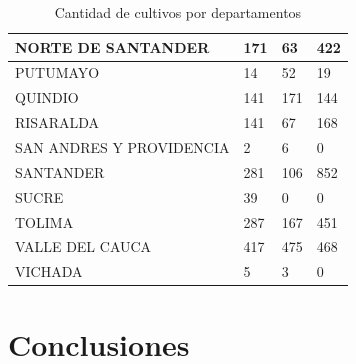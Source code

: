 \documentclass[12pt,a4paper]{article}
\begin{document}
\begin{table}[H]
\begin{tabular}{|llll|}
        \multicolumn{1}{|l|}{NORTE DE SANTANDER}       & \multicolumn{1}{l|}{171}               & \multicolumn{1}{l|}{63}              & 422           \\ \hline
        \multicolumn{1}{|l|}{PUTUMAYO}                 & \multicolumn{1}{l|}{14}                & \multicolumn{1}{l|}{52}              & 19            \\ \hline
        \multicolumn{1}{|l|}{QUINDIO}                  & \multicolumn{1}{l|}{141}               & \multicolumn{1}{l|}{171}             & 144           \\ \hline
        \multicolumn{1}{|l|}{RISARALDA}                & \multicolumn{1}{l|}{141}               & \multicolumn{1}{l|}{67}              & 168           \\ \hline
        \multicolumn{1}{|l|}{SAN ANDRES Y PROVIDENCIA} & \multicolumn{1}{l|}{2}                 & \multicolumn{1}{l|}{6}               & 0             \\ \hline
        \multicolumn{1}{|l|}{SANTANDER}                & \multicolumn{1}{l|}{281}               & \multicolumn{1}{l|}{106}             & 852           \\ \hline
        \multicolumn{1}{|l|}{SUCRE}                    & \multicolumn{1}{l|}{39}                & \multicolumn{1}{l|}{0}               & 0             \\ \hline
        \multicolumn{1}{|l|}{TOLIMA}                   & \multicolumn{1}{l|}{287}               & \multicolumn{1}{l|}{167}             & 451           \\ \hline
        \multicolumn{1}{|l|}{VALLE DEL CAUCA}          & \multicolumn{1}{l|}{417}               & \multicolumn{1}{l|}{475}             & 468           \\ \hline
        \multicolumn{1}{|l|}{VICHADA}                  & \multicolumn{1}{l|}{5}                 & \multicolumn{1}{l|}{3}               & 0             \\ \hline
    \end{tabular}
    \caption{Cantidad de cultivos por departamentos}
    \label{tab:contingencia}
\end{table}

\section*{Conclusiones}
\end{document}
